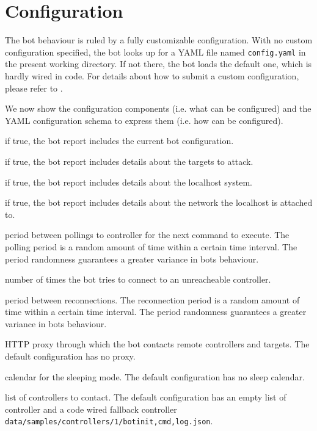 \section{Configuration}
\label{sec:configuration}

The bot behaviour is ruled by a fully customizable configuration. With no custom configuration specified, the bot looks up for a YAML file named \texttt{config.yaml} in the present working directory. If not there, the bot loads the default one, which is hardly wired in code. For details about how to submit a custom configuration, please refer to .

We now show the configuration components (i.e. what can be configured) and the YAML configuration schema to express them (i.e. how can be configured).

\begin{description}
  \setlength\itemsep{1em}

  \item[cnfInfo] if true, the bot report includes the current bot configuration.

  \item[tgtInfo] if true, the bot report includes details about the targets to attack.

  \item[sysInfo] if true, the bot report includes details about the localhost system.

  \item[netInfo] if true, the bot report includes details about the network the localhost is attached to.

  \item[polling] period between pollings to controller for the next command to execute. The polling period is a random amount of time within a certain time interval. The period randomness guarantees a greater variance in bots behaviour.

  \item[reconnections] number of times the bot tries to connect to an unreacheable controller.

  \item[reconnectionWait] period between reconnections. The reconnection period is a random amount of time within a certain time interval. The period randomness guarantees a greater variance in bots behaviour.

  \item[proxy] HTTP proxy through which the bot contacts remote controllers and targets. The default configuration has no proxy.

  \item[sleep] calendar for the sleeping mode. The default configuration has no sleep calendar.

  \item[controllers] list of controllers to contact. The default configuration has an empty list of controller and a code wired fallback controller \texttt{data/samples/controllers/1/bot{init,cmd,log}.json}.
\end{description}

